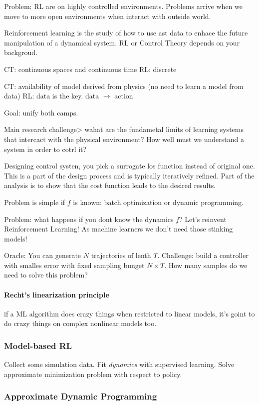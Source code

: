 \documentclass[11pt,oneside,a4paper]{scrartcl}
\begin{document}
Problem: RL are on highly controlled environments. Problems arrive
when we move to more open environments when interact with outside
world.

Reinforcement learning is the study of how to use ast data to enhace
the future manipulation of a dynamical system. RL or Control Theory
depends on your backgroud.

CT: continuous spaces and continuous time
RL: discrete

CT: availability of model derived from physics (no need to learn a
model from data)
RL: data is the key. data $\rightarrow$ action

Goal: unify both camps.

Main research challenge> wahat are the fundametal limits of learning
systems that intercact with the physical environment?
How well must we understand a system in order to cotrl it?

Designing control systen, you pick a surrogate los function instead of
original one. This is a part of the design process and is typically
iteratively refined. Part of the analysis is to show that the cost
function leads to the desired results.

Problem is simple if $f$ is known: batch optimization or dynamic
programming.

Problem: what happens if you dont know the dynamics $f$? Let's
reinvent Reinforcement Learning! As machine learners we don't need
those stinking models!

Oracle: You can generate $N$ trajectories of lenth $T$. Challenge: build a
controller with smalles error with fixed sampling bunget $N \times T$.
How many samples do we need to solve this problem?

\paragraph{Recht's linearization principle} if a ML algorithm does crazy things when
restricted to linear models, it's goint to do crazy things on complex
nonlinear models too.

\subsubsection{Model-based RL}

Collect some simulation data. Fit \emph{dynamics} with supervised
learning. Solve approximate minimization problem with respect to policy.

\subsubsection{Approximate Dynamic Programming}
\end{document}
